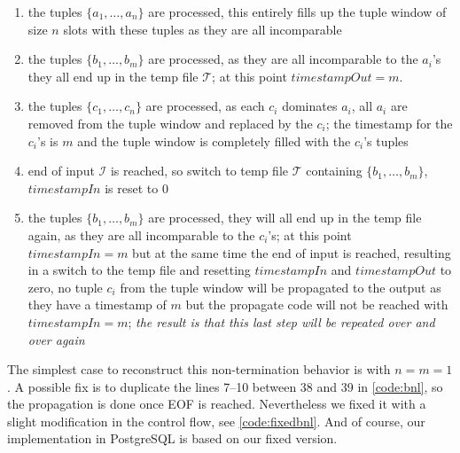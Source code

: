 \begin{enumerate}
\item 
the tuples $\{a_1, \ldots, a_n\}$ are processed, this entirely fills up
the tuple window of size $n$ slots with these tuples as they are all
incomparable

\item 
the tuples $\{b_1, \ldots, b_m\}$ are processed, as they are all
incomparable to the $a_i$'s they all end up in the temp file
$\mathcal{T}$; at this point $timestampOut = m$.

\item
the tuples $\{c_1, \ldots, c_n\}$ are processed, as each $c_i$
dominates $a_i$, all $a_i$ are removed from the tuple window and
replaced by the $c_i$; the timestamp for the $c_i$'s is $m$ and the
tuple window is completely filled with the $c_i$'s tuples

\item
end of input $\mathcal{I}$ is reached, so switch to temp file
$\mathcal{T}$ containing $\{b_1, \ldots, b_m\}$, $timestampIn$ is
reset to $0$

\item
the tuples $\{b_1, \ldots, b_m\}$ are processed, they will all end up
in the temp file again, as they are all incomparable to the $c_i$'s;
at this point $timestampIn = m$ but at the same time the end of input
is reached, resulting in a switch to the temp file and resetting
$timestampIn$ and $timestampOut$ to zero, no tuple $c_i$ from the
tuple window will be propagated to the output as they have a timestamp
of $m$ but the propagate code will not be reached with $timestampIn =
m$;
\emph{the result is that this last step will be repeated over and over again}
\end{enumerate}

The simplest case to reconstruct this non-termination behavior is with
$n=m=1$.  A possible fix is to duplicate the lines 7--10 between 38
and 39 in \autoref{code:bnl}, so the propagation is done once EOF
is reached.  Nevertheless we fixed it with a slight modification in
the control flow, see \autoref{code:fixedbnl}.  And of course, our
implementation in PostgreSQL is based on our fixed version.

